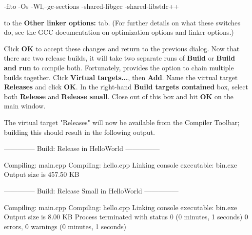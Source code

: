 \begin{code}
-flto
-Os
-Wl,--gc-sections
-shared-libgcc
-shared-libstdc++
\end{code}

to the \textbf{Other linker options:} tab. (For further details on what these switches do, see the GCC documentation on optimization options and linker options.)


Click \textbf{OK} to accept these changes and return to the previous dialog. Now that there are two release builds, it will take two separate runs of \textbf{Build} or \textbf{Build and run} to compile both. Fortunately, \codeblocks provides the option to chain multiple builds together. Click \textbf{Virtual targets...}, then \textbf{Add}. Name the virtual target \textbf{Releases} and click \textbf{OK}. In the right-hand \textbf{Build targets contained} box, select both \textbf{Release} and \textbf{Release small}. Close out of this box and hit \textbf{OK} on the main window. 


The virtual target "Releases" will now be available from the Compiler Toolbar; building this should result in the following output.

\begin{code}
-------------- Build: Release in HelloWorld ---------------

Compiling: main.cpp
Compiling: hello.cpp
Linking console executable: bin\Release\HelloWorld.exe
Output size is 457.50 KB

-------------- Build: Release Small in HelloWorld ---------------

Compiling: main.cpp
Compiling: hello.cpp
Linking console executable: bin\ReleaseSmall\HelloWorld.exe
Output size is 8.00 KB
Process terminated with status 0 (0 minutes, 1 seconds)
0 errors, 0 warnings (0 minutes, 1 seconds) 
\end{code}
